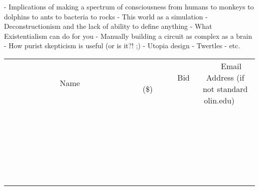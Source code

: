 \documentclass[11pt]{article}
\begin{document}
- Implications of making a spectrum of consciousness from humans to monkeys to dolphins to ants to bacteria to rocks
- This world as a simulation
- Deconstructionism and the lack of ability to define anything
- What Existentialism can do for you
- Manually building a circuit as complex as a brain
- How purist skepticism is useful (or is it?! ;)
- Utopia design
- Twertles
- etc.
\\[6ex]
\begin{tabular}{c c c}
~~~~~~~~~~~~~Name~~~~~~~~~~~~~ & ~~~~~~~~~Bid (\$)~~~~~~~~~  & ~~~Email Address (if not standard olin.edu)~~~\\
 & & \\
\hline
 & & \\
\hline
 & & \\
\hline
 & & \\
\hline
 & & \\
\hline
 & & \\
\hline
 & & \\
\hline
 & & \\
\hline
 & & \\
\hline
 & & \\
\hline
 & & \\
\hline
 & & \\
\hline
 & & \\
\hline
 & & \\
\hline
 & & \\
\hline
 & & \\
\hline
 & & \\
\hline
 & & \\
\hline
 & & \\
\hline
 & & \\
\hline
 & & \\
\hline
 & & \\
\hline
 & & \\
\hline
 & & \\
\hline
 & & \\
\hline
 & & \\
\hline
\end{tabular}
\newpage
\end{document}

